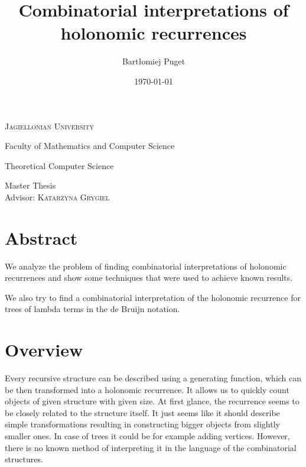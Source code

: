 \documentclass[final]{article}
\title{Combinatorial interpretations of holonomic recurrences}
\author{Bartłomiej Puget}
\date{\today}
\theoremstyle{definition}
\theoremstyle{remark}
\begin{document}
\begin{titlepage}
	\begin{center}
	\textsc{\LARGE Jagiellonian University}

	\Large Faculty of Mathematics and Computer Science

	\Large Theoretical Computer Science

	\vfill

	\vspace{1cm}
	\hrulefill
	\vspace{0.5cm}

    \makeatletter
    \huge \textsc{\@title}
    \makeatother

	\vspace{0.2cm}
	\hrulefill

	\vspace{1cm}
    \makeatletter
	\textsc{\Large \@author}
    \makeatother

	\vspace{1cm}
    \normalsize

	Master Thesis\\
	Advisor: \textsc{Katarzyna Grygiel}

	\vfill

    \makeatletter
    \@date
    \makeatother
	\end{center}
\end{titlepage}

\section*{Abstract}%
\label{sec:abstract}

We analyze the problem of finding combinatorial interpretations of holonomic recurrences and show some techniques that were used to achieve known results.

We also try to find a combinatorial interpretation of the holonomic recurrence for trees of lambda terms in the de Bruijn notation.

\clearpage

\tableofcontents
\clearpage

\section{Overview}%

Every recursive structure can be described using a generating function, which can be then transformed into a holonomic recurrence. It allows us to quickly count objects of given structure with given size. At first glance, the recurrence seems to be closely related to the structure itself. It just seems like it should describe simple transformations resulting in constructing bigger objects from slightly smaller ones. In case of trees it could be for example adding vertices. However, there is no known method of interpreting it in the language of the combinatorial structures.
\end{document}
